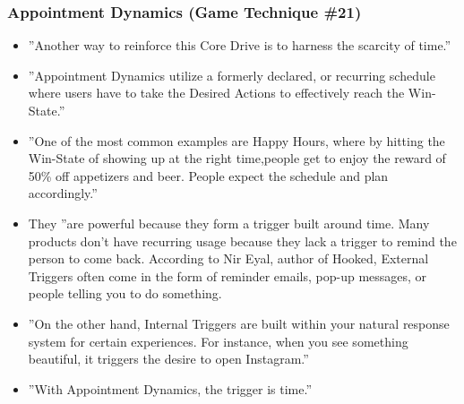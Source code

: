 \subsubsection{Appointment Dynamics (Game Technique \#21)}
    \begin{itemize}
        \item ''Another way to reinforce this Core Drive is to harness the scarcity of time.''
        \item ''Appointment Dynamics utilize a formerly declared, or recurring schedule where users have to take the Desired Actions to effectively reach the Win-State.''
        \item ''One of the most common examples are Happy Hours, where by hitting the Win-State of showing up at the right time,people get to enjoy the reward of 50\% off appetizers and beer. People expect the schedule and plan accordingly.''
        \item They ''are powerful because they form a trigger built around time. Many products don't have recurring usage because they lack a trigger to remind the person to come back. According to Nir Eyal, author of Hooked, External Triggers often come in the form of reminder emails, pop-up messages, or people telling you to do something.
        \item ''On the other hand, Internal Triggers are built within your natural response system for certain experiences. For instance, when you see something beautiful, it triggers the desire to open Instagram.''
        \item ''With Appointment Dynamics, the trigger is time.''
    \end{itemize}
    
